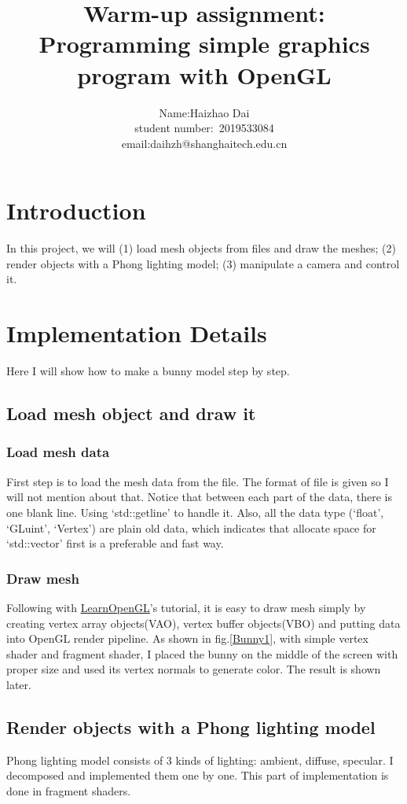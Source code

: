\documentclass[acmtog]{acmart}
\title{Warm-up assignment:\\ {Programming simple graphics program with OpenGL}}
\author{Name:\quad Haizhao Dai\\
student number:\ 2019533084\\
email:\quad daihzh@shanghaitech.edu.cn}
\begin{document}
\maketitle

\vspace*{2 ex}

\section{Introduction}
In this project, we will (1) load mesh objects from files and draw the meshes;
(2) render objects with a Phong lighting model; (3) manipulate a camera and control it.

\section{Implementation Details}
Here I will show how to make a bunny model step by step.

\subsection{Load mesh object and draw it}

\subsubsection{Load mesh data}
First step is to load the mesh data from the file. The format of file is given so I will not mention about that.
Notice that between each part of the data, there is one blank line. Using `std::getline' to handle it.
Also, all the data type (`float', `GLuint', `Vertex') are plain old data,
which indicates that allocate space for `std::vector' first is a preferable and fast way.

\subsubsection{Draw mesh}
Following with \href{LearnOpenGL.com}{LearnOpenGL}'s tutorial,
it is easy to draw mesh simply by creating vertex array objects(VAO),
vertex buffer objects(VBO) and putting data into OpenGL render pipeline.
As shown in fig.\ref{Bunny1}, with simple vertex shader and fragment shader,
I placed the bunny on the middle of the screen with proper size and used its vertex normals to generate color.
The result is shown later.

\subsection{Render objects with a Phong lighting model}
Phong lighting model consists of 3 kinds of lighting:
ambient, diffuse, specular. I decomposed and implemented them one by one.
This part of implementation is done in fragment shaders.
\end{document}
